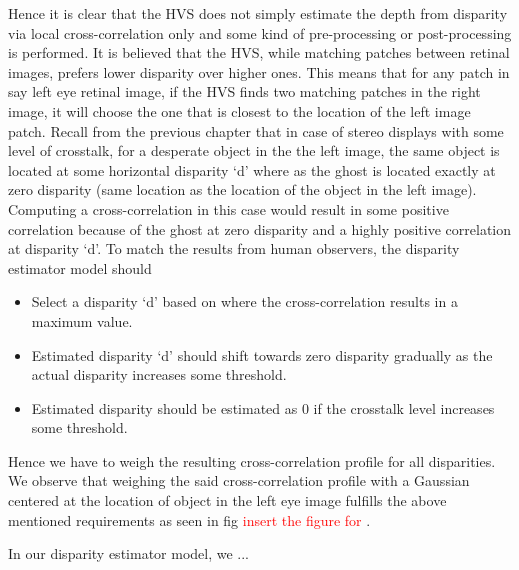 Hence it is clear that the HVS does not simply estimate the depth from disparity via local cross-correlation only and some kind of pre-processing or post-processing is performed. It is believed that the HVS, while matching patches between retinal images, prefers lower disparity over higher ones. This means that for any patch in say left eye retinal image, if the HVS finds two matching patches in the right image, it will choose the one that is closest to the location of the left image patch. Recall from the previous chapter that in case of stereo displays with some level of crosstalk, for a desperate object in the the left image, the same object is located at some horizontal disparity `d' where as the ghost is located exactly at zero disparity (same location as the location of the object in the left image). Computing a cross-correlation in this case would result in some positive correlation because of the ghost at zero disparity and a highly positive correlation at disparity `d'. To match the results from human observers, the disparity estimator model should
\begin{itemize}
\item{Select a disparity `d' based on where the cross-correlation results in a maximum value.}
\item{Estimated disparity `d' should shift towards zero disparity gradually as the actual disparity increases some threshold.}
\item{Estimated disparity should be estimated as 0 if the crosstalk level increases some threshold.}
\end{itemize}
Hence we have to weigh the resulting cross-correlation profile for all disparities. We observe that weighing the said cross-correlation profile with a Gaussian centered at the location of object in the left eye image fulfills the above mentioned requirements as seen in fig \textcolor{red}{insert the figure for }.

In our disparity estimator model, we ...



